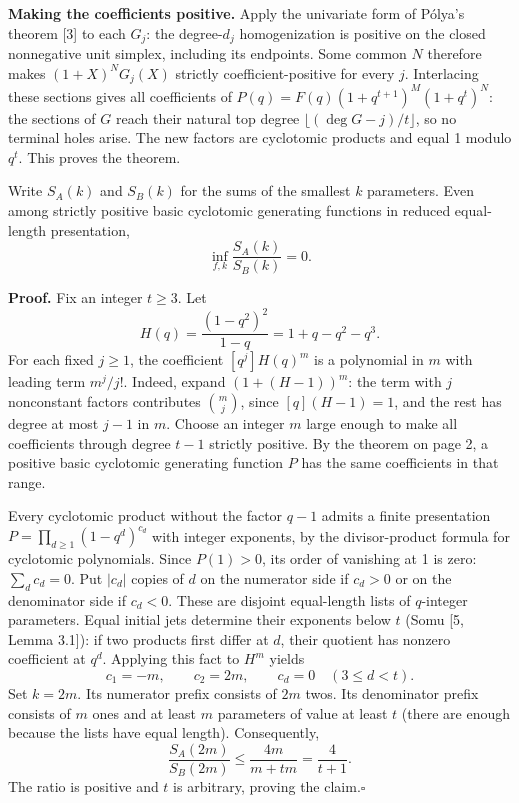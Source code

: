 \documentclass[11pt]{article}
\newcommand{\sect}[1]{\vspace{4pt}{\large\bfseries\color{ink}#1}\par}
\begin{document}
\textbf{Making the coefficients positive.} Apply the univariate form of P\'olya's theorem [3] to each $G_j$: the degree-$d_j$ homogenization is positive on the closed nonnegative unit simplex, including its endpoints. Some common $N$ therefore makes $(1+X)^NG_j(X)$ strictly coefficient-positive for every $j$. Interlacing these sections gives all coefficients of $P(q)=F(q)(1+q^{t+1})^M(1+q^t)^N$: the sections of $G$ reach their natural top degree $\lfloor(\deg G-j)/t\rfloor$, so no terminal holes arise. The new factors are cyclotomic products and equal 1 modulo $q^t$. This proves the theorem.

\newpage\sect{3. No universal multiplicative lower bound}
Write $S_A(k)$ and $S_B(k)$ for the sums of the smallest $k$ parameters. Even among strictly positive basic cyclotomic generating functions in reduced equal-length presentation,
\[
 \inf_{f,k}\frac{S_A(k)}{S_B(k)}=0.
\]

\textbf{Proof.} Fix an integer $t\ge3$. Let
\[
 H(q)=\frac{(1-q^2)^2}{1-q}=1+q-q^2-q^3 .
\]
For each fixed $j\ge1$, the coefficient $[q^j]H(q)^m$ is a polynomial in $m$ with leading term $m^j/j!$. Indeed, expand $(1+(H-1))^m$: the term with $j$ nonconstant factors contributes $\binom{m}{j}$, since $[q](H-1)=1$, and the rest has degree at most $j-1$ in $m$. Choose an integer $m$ large enough to make all coefficients through degree $t-1$ strictly positive. By the theorem on page 2, a positive basic cyclotomic generating function $P$ has the same coefficients in that range.

Every cyclotomic product without the factor $q-1$ admits a finite presentation $P=\prod_{d\ge1}(1-q^d)^{c_d}$ with integer exponents, by the divisor-product formula for cyclotomic polynomials. Since $P(1)>0$, its order of vanishing at 1 is zero: $\sum_d c_d=0$. Put $|c_d|$ copies of $d$ on the numerator side if $c_d>0$ or on the denominator side if $c_d<0$. These are disjoint equal-length lists of $q$-integer parameters. Equal initial jets determine their exponents below $t$ (Somu [5, Lemma 3.1]): if two products first differ at $d$, their quotient has nonzero coefficient at $q^d$. Applying this fact to $H^m$ yields
\[
 c_1=-m,\qquad c_2=2m,\qquad c_d=0\quad(3\le d<t).
\]
Set $k=2m$. Its numerator prefix consists of $2m$ twos. Its denominator prefix consists of $m$ ones and at least $m$ parameters of value at least $t$ (there are enough because the lists have equal length). Consequently,
\[
 \frac{S_A(2m)}{S_B(2m)}\le \frac{4m}{m+tm}=\frac4{t+1}.
\]
The ratio is positive and $t$ is arbitrary, proving the claim.\hfill$\square$
\end{document}
